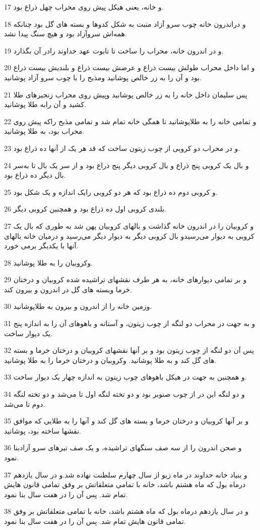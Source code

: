 \par 17 و خانه، یعنی هیکل پیش روی محراب چهل ذراع بود.
\par 18 و دراندرون خانه چوب سرو آزاد منبت به شکل کدوها و بسته های گل بود چنانکه همه‌اش سروآزاد بود و هیچ سنگ پیدا نشد.
\par 19 و در اندرون خانه، محراب را ساخت تا تابوت عهد خداوند رادر آن بگذارد.
\par 20 و اما داخل محراب طولش بیست ذراع و عرضش بیست ذراع و بلندیش بیست ذراع بود و آن را به زر خالص پوشانید ومذبح را با چوب سرو آزاد پوشانید.
\par 21 پس سلیمان داخل خانه را به زر خالص پوشانید وپیش روی محراب زنجیرهای طلا کشید و آن رابه طلا پوشانید.
\par 22 و تمامی خانه را به طلاپوشانید تا همگی خانه تمام شد و تمامی مذبح راکه پیش روی محراب بود، به طلا پوشانید.
\par 23 و در محراب دو کروبی از چوب زیتون ساخت که قد هر یک از آنها ده ذراع بود.
\par 24 و بال یک کروبی پنج ذراع و بال کروبی دیگر پنج ذراع بود و از سر یک بال تا به‌سر بال دیگر ده ذراع بود.
\par 25 و کروبی دوم ده ذراع بود که هر دو کروبی رایک اندازه و یک شکل بود.
\par 26 بلندی کروبی اول ده ذراع بود و همچنین کروبی دیگر.
\par 27 و کروبیان را در اندرون خانه گذاشت و بالهای کروبیان پهن شد به طوری که بال یک کروبی به دیوار می‌رسیدو بال کروبی دیگر به دیوار دیگر می‌رسید و درمیان خانه بالهای آنها با یکدیگر برمی خورد.
\par 28 وکروبیان را به طلا پوشانید.
\par 29 و بر تمامی دیوارهای خانه، به هر طرف نقشهای تراشیده شده کروبیان و درختان خرما وبسته های گل در اندرون و بیرون کند.
\par 30 وزمین خانه را از اندرون و بیرون به طلاپوشانید.
\par 31 و به جهت در محراب دو لنگه از چوب زیتون، و آستانه و باهوهای آن را به اندازه پنج یک دیوار ساخت.
\par 32 پس آن دو لنگه از چوب زیتون بود و بر آنها نقشهای کروبیان و درختان خرما و بسته های گل کند و به طلا پوشانید. وکروبیان و درختان خرما را به طلا پوشانید.
\par 33 و همچنین به جهت در هیکل باهوهای چوب زیتون به اندازه چهار یک دیوار ساخت.
\par 34 و دو لنگه این در از چوب صنوبر بود و دو تخته لنگه اول تا می‌شد و دو تخته لنگه دوم تا می‌شد.
\par 35 و بر آنها کروبیان و درختان خرما و بسته های گل کند و آنها را به طلایی که موافق نقشها ساخته بود، پوشانید.
\par 36 و صحن اندرون را از سه صف سنگهای تراشیده، و یک صف تیرهای سرو آزادبنا نمود.
\par 37 و بنیاد خانه خداوند در ماه زیو از سال چهارم سلطنت نهاده شد.و در سال یازدهم درماه بول که ماه هشتم باشد، خانه با تمامی متعلقاتش بر وفق تمامی قانون هایش تمام شد. پس آن را در هفت سال بنا نمود.
\par 38 و در سال یازدهم درماه بول که ماه هشتم باشد، خانه با تمامی متعلقاتش بر وفق تمامی قانون هایش تمام شد. پس آن را در هفت سال بنا نمود.
 
